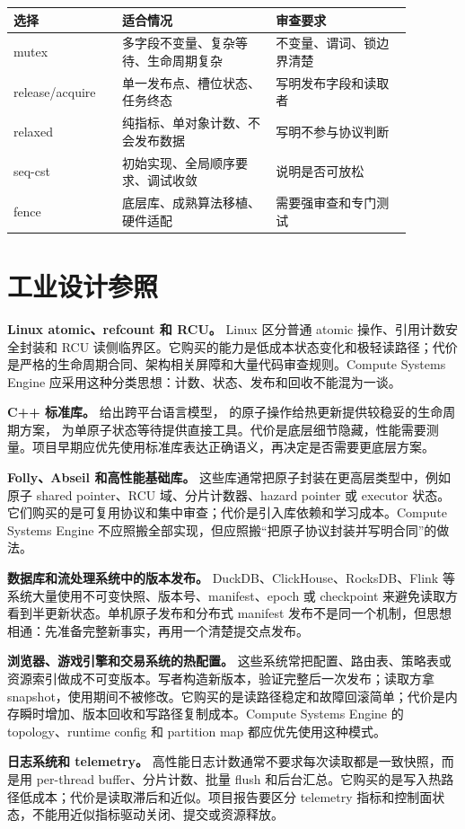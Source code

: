 \begin{center}
\begin{tabular}{p{0.24\linewidth}p{0.34\linewidth}p{0.30\linewidth}}
\toprule
选择 & 适合情况 & 审查要求 \\
\midrule
mutex & 多字段不变量、复杂等待、生命周期复杂 & 不变量、谓词、锁边界清楚 \\
release/acquire & 单一发布点、槽位状态、任务终态 & 写明发布字段和读取者 \\
relaxed & 纯指标、单对象计数、不会发布数据 & 写明不参与协议判断 \\
seq-cst & 初始实现、全局顺序要求、调试收敛 & 说明是否可放松 \\
fence & 底层库、成熟算法移植、硬件适配 & 需要强审查和专门测试 \\
\bottomrule
\end{tabular}
\end{center}

\section{工业设计参照}

\begin{casebox}
\textbf{Linux atomic、refcount 和 RCU。}
Linux 区分普通 atomic 操作、引用计数安全封装和 RCU 读侧临界区。它购买的能力是低成本状态变化和极轻读路径；代价是严格的生命周期合同、架构相关屏障和大量代码审查规则。Compute Systems Engine 应采用这种分类思想：计数、状态、发布和回收不能混为一谈。

\textbf{C++ 标准库。}
 给出跨平台语言模型， 的原子操作给热更新提供较稳妥的生命周期方案， 为单原子状态等待提供直接工具。代价是底层细节隐藏，性能需要测量。项目早期应优先使用标准库表达正确语义，再决定是否需要更底层方案。

\textbf{Folly、Abseil 和高性能基础库。}
这些库通常把原子封装在更高层类型中，例如原子 shared pointer、RCU 域、分片计数器、hazard pointer 或 executor 状态。它们购买的是可复用协议和集中审查；代价是引入库依赖和学习成本。Compute Systems Engine 不应照搬全部实现，但应照搬“把原子协议封装并写明合同”的做法。

\textbf{数据库和流处理系统中的版本发布。}
DuckDB、ClickHouse、RocksDB、Flink 等系统大量使用不可变快照、版本号、manifest、epoch 或 checkpoint 来避免读取方看到半更新状态。单机原子发布和分布式 manifest 发布不是同一个机制，但思想相通：先准备完整新事实，再用一个清楚提交点发布。

\textbf{浏览器、游戏引擎和交易系统的热配置。}
这些系统常把配置、路由表、策略表或资源索引做成不可变版本。写者构造新版本，验证完整后一次发布；读取方拿 snapshot，使用期间不被修改。它购买的是读路径稳定和故障回滚简单；代价是内存瞬时增加、版本回收和写路径复制成本。Compute Systems Engine 的 topology、runtime config 和 partition map 都应优先使用这种模式。

\textbf{日志系统和 telemetry。}
高性能日志计数通常不要求每次读取都是一致快照，而是用 per-thread buffer、分片计数、批量 flush 和后台汇总。它购买的是写入热路径低成本；代价是读取滞后和近似。项目报告要区分 telemetry 指标和控制面状态，不能用近似指标驱动关闭、提交或资源释放。
\end{casebox}

